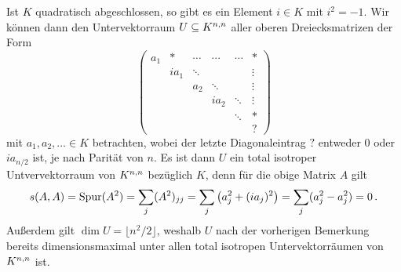 Ist $K$ quadratisch abgeschlossen, so gibt es ein Element $i \in K$ mit $i^2 = -1$.
Wir können dann den Untervektorraum $U \subseteq \matrices{n}{K}$ aller oberen Dreiecksmatrizen der Form
\[
  \begin{pmatrix}
    a_1 & *     & \cdots  & \cdots  & \cdots  & *       \\
        & i a_1 & \ddots  &         &         & \vdots  \\
        &       & a_2     & \ddots  &         & \vdots  \\
        &       &         & i a_2   & \ddots  & \vdots  \\
        &       &         &         & \ddots  & *       \\
        &       &         &         &         & ?
  \end{pmatrix}
\]
mit $a_1, a_2, \dotsc \in K$ betrachten, wobei der letzte Diagonaleintrag $?$ entweder $0$ oder $i a_{n/2}$ ist, je nach Parität von $n$.
Es ist dann $U$ ein total isotroper Untvervektorraum von $\matrices{n}{K}$ bezüglich $K$, denn für die obige Matrix $A$ gilt
\[
    s(A,A)
  = \tr(A^2)
  = \sum_j (A^2)_{jj}
  = \sum_j \left( a_j^2 + (i a_j)^2 \right)
  = \sum_j ( a_j^2 - a_j^2 )
  = 0 \,.
\]
Außerdem gilt $\dim U = \lfloor n^2/2 \rfloor$, weshalb $U$ nach der vorherigen Bemerkung bereits dimensionsmaximal unter allen total isotropen Untervektorräumen von $\matrices{n}{K}$ ist.



